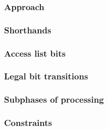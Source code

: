 \subsubsection{Approach                            } \label{rlp txn v2: phase constraints: access list: approach}              
\subsubsection{Shorthands                          } \label{rlp txn v2: phase constraints: access list: shorthands}            
\subsubsection{Access list bits                    } \label{rlp txn v2: phase constraints: access list: access list bits}      
\subsubsection{Legal bit transitions               } \label{rlp txn v2: phase constraints: access list: legal transitions}     
\subsubsection{Subphases of processing             } \label{rlp txn v2: phase constraints: access list: access list prefix}    
\subsubsection{Constraints                         } \label{rlp txn v2: phase constraints: access list: constraints}           

